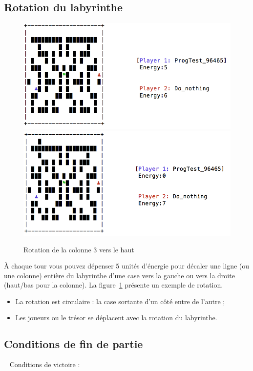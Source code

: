 \documentclass[french,12pt,a4paper,twoside,openright,titlepage]{report}
\begin{document}
\subsection{Rotation du labyrinthe}
\begin{figure}
\includegraphics[width=\textwidth]{laby-r1.png}\\
\includegraphics[width=\textwidth]{laby-r2.png}
\caption{\label{fig:rot} Rotation de la colonne 3 vers le haut}
\end{figure}

À chaque tour vous pouvez dépenser 5 unités d'énergie pour décaler une ligne
(ou une colonne) entière du labyrinthe d'une case vers la gauche ou vers la droite
 (haut/bas pour la colonne). La figure~\ref{fig:rot} présente un exemple de rotation.
 
 \begin{itemize}
 \item La rotation est circulaire : la case sortante d'un côté entre de l'autre ;
\item Les joueurs ou le trésor se déplacent avec la rotation du labyrinthe.
 \end{itemize}

\subsection{Conditions de fin de partie}
~\label{sec:endgame}
Conditions de victoire :
\end{document}
